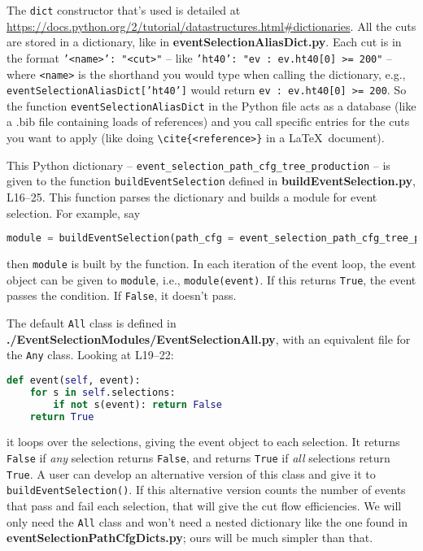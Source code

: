 The \texttt{dict} constructor that's used is detailed at \url{https://docs.python.org/2/tutorial/datastructures.html#dictionaries}. All the cuts are stored in a dictionary, like in \textbf{eventSelectionAliasDict.py}. Each cut is in the format \texttt{'<name>': "<cut>"} -- like \texttt{'ht40': "ev : ev.ht40[0] >= 200"} -- where \texttt{<name>} is the shorthand you would type when calling the dictionary, e.g., \texttt{eventSelectionAliasDict['ht40']} would return \texttt{ev : ev.ht40[0] >= 200}. So the function \texttt{eventSelectionAliasDict} in the Python file acts as a database (like a .bib file containing loads of references) and you call specific entries for the cuts you want to apply (like doing \verb!\cite{<reference>}! in a \LaTeX\ document).

This Python dictionary -- \texttt{event\_selection\_path\_cfg\_tree\_production} -- is given to the function \texttt{buildEventSelection} defined in \textbf{buildEventSelection.py}, L16--25. This function parses the dictionary and builds a module for event selection. For example, say

\begin{lstlisting}[belowskip=-0.7cm, language=python, numbers=none]
module = buildEventSelection(path_cfg = event_selection_path_cfg_tree_production)
\end{lstlisting}

then \texttt{module} is built by the function. In each iteration of the event loop, the event object can be given to \texttt{module}, i.e., \texttt{module(event)}. If this returns \texttt{True}, the event passes the condition. If \texttt{False}, it doesn't pass.

The default \texttt{All} class is defined in \textbf{./EventSelectionModules/EventSelectionAll.py}, with an equivalent file for the \texttt{Any} class. Looking at L19--22:

\begin{lstlisting}[belowskip=-0.7cm, language=python, numbers=none]
def event(self, event):
	for s in self.selections:
		if not s(event): return False
	return True
\end{lstlisting}

it loops over the selections, giving the event object to each selection. It returns \texttt{False} if \emph{any} selection returns \texttt{False}, and returns \texttt{True} if \emph{all} selections return \texttt{True}. A user can develop an alternative version of this class and give it to \texttt{buildEventSelection()}. If this alternative version counts the number of events that pass and fail each selection, that will give the cut flow efficiencies. We will only need the \texttt{All} class and won't need a nested dictionary like the one found in \textbf{eventSelectionPathCfgDicts.py}; ours will be much simpler than that.

